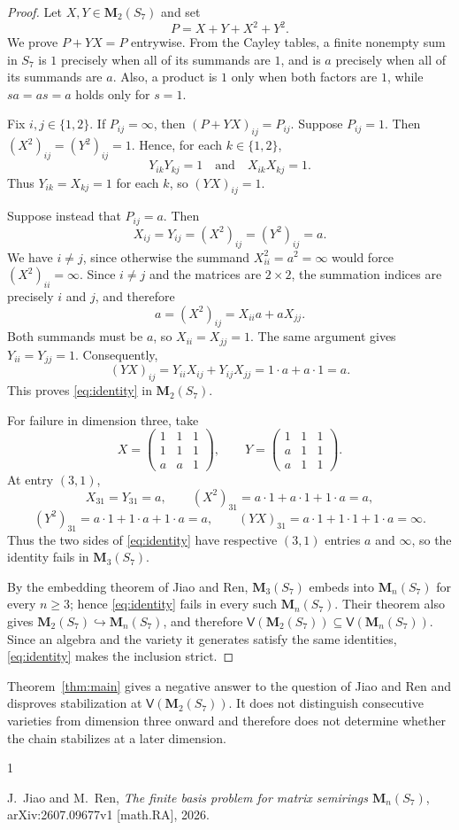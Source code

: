 \documentclass{amsart}
\newcommand{\M}{\mathbf{M}}
\newcommand{\V}{\mathsf{V}}
\begin{document}
\begin{proof}
Let $X,Y\in\M_2(S_7)$ and set
\[
 P=X+Y+X^2+Y^2.
\]
We prove $P+YX=P$ entrywise. From the Cayley tables, a finite nonempty
sum in $S_7$ is $1$ precisely when all of its summands are $1$, and is
$a$ precisely when all of its summands are $a$. Also, a product is $1$
only when both factors are $1$, while $sa=as=a$ holds only for $s=1$.

Fix $i,j\in\{1,2\}$. If $P_{ij}=\infty$, then
$(P+YX)_{ij}=P_{ij}$. Suppose $P_{ij}=1$. Then
$(X^2)_{ij}=(Y^2)_{ij}=1$. Hence, for each $k\in\{1,2\}$,
\[
 Y_{ik}Y_{kj}=1
 \quad\text{and}\quad
 X_{ik}X_{kj}=1.
\]
Thus $Y_{ik}=X_{kj}=1$ for each $k$, so $(YX)_{ij}=1$.

Suppose instead that $P_{ij}=a$. Then
\[
 X_{ij}=Y_{ij}=(X^2)_{ij}=(Y^2)_{ij}=a.
\]
We have $i\neq j$, since otherwise the summand
$X_{ii}^2=a^2=\infty$ would force $(X^2)_{ii}=\infty$.
Since $i\neq j$ and the matrices are $2\times2$, the summation indices
are precisely $i$ and $j$, and therefore
\[
 a=(X^2)_{ij}=X_{ii}a+aX_{jj}.
\]
Both summands must be $a$, so $X_{ii}=X_{jj}=1$. The same argument gives
$Y_{ii}=Y_{jj}=1$. Consequently,
\[
 (YX)_{ij}=Y_{ii}X_{ij}+Y_{ij}X_{jj}=1\cdot a+a\cdot1=a.
\]
This proves \eqref{eq:identity} in $\M_2(S_7)$.

For failure in dimension three, take
\[
 X=\begin{pmatrix}
 1&1&1\\
 1&1&1\\
 a&a&1
 \end{pmatrix},
 \qquad
 Y=\begin{pmatrix}
 1&1&1\\
 a&1&1\\
 a&1&1
 \end{pmatrix}.
\]
At entry $(3,1)$,
\[
 X_{31}=Y_{31}=a,
 \qquad
 (X^2)_{31}=a\cdot1+a\cdot1+1\cdot a=a,
\]
\[
 (Y^2)_{31}=a\cdot1+1\cdot a+1\cdot a=a,
 \qquad
 (YX)_{31}=a\cdot1+1\cdot1+1\cdot a=\infty.
\]
Thus the two sides of \eqref{eq:identity} have respective $(3,1)$ entries
$a$ and $\infty$, so the identity fails in $\M_3(S_7)$.

By the embedding theorem of Jiao and Ren,
$\M_3(S_7)$ embeds into $\M_n(S_7)$ for every $n\geq 3$; hence
\eqref{eq:identity} fails in every such $\M_n(S_7)$. Their theorem also
gives $\M_2(S_7)\hookrightarrow\M_n(S_7)$, and therefore
$\V(\M_2(S_7))\subseteq\V(\M_n(S_7))$. Since an algebra and the variety
it generates satisfy the same identities, \eqref{eq:identity} makes the
inclusion strict.
\end{proof}

Theorem~\ref{thm:main} gives a negative answer to the question of Jiao and
Ren and disproves stabilization at $\V(\M_2(S_7))$. It does not distinguish
consecutive varieties from dimension three onward and therefore does not
determine whether the chain stabilizes at a later dimension.

\begin{thebibliography}{1}

J.~Jiao and M.~Ren,
\emph{The finite basis problem for matrix semirings $\M_n(S_7)$},
arXiv:2607.09677v1 [math.RA], 2026.

\end{thebibliography}
\end{document}
